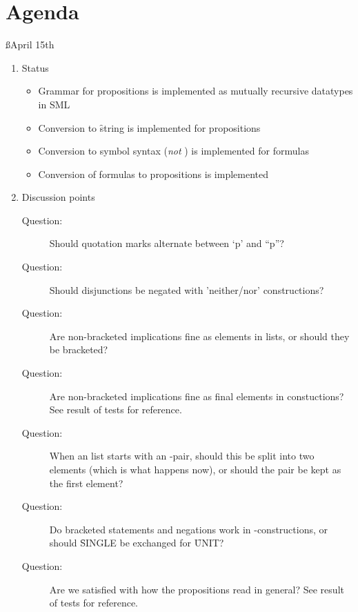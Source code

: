 \documentclass[a4paper]{article}
\begin{document}
\section{Agenda}

\ss{April 15th}

\begin{enumerate}
  \item Status
    \begin{itemize}
      \item Grammar for propositions is implemented as mutually recursive 
      datatypes in SML

      \item Conversion to \f{string} is implemented for propositions
      
      \item Conversion to symbol syntax (\emph{not} ) is
      implemented for formulas

      \item Conversion of formulas to propositions is implemented
    \end{itemize}

  \item Discussion points
    \begin{description}
      \item[Question:] Should quotation marks alternate between `p' and 
      ``p''?

      \item[Question:] Should disjunctions be negated with 'neither/nor'
      constructions?

      \item[Question:] Are non-bracketed implications fine as elements in
      lists, or should they be bracketed?

      \item[Question:] Are non-bracketed implications fine as final elements
      in  constuctions? See result of tests for reference.

      \item[Question:] When an  list starts with an -pair, 
      should this be split into two elements (which is what happens now), 
      or should the pair be kept as the first element?

      \item[Question:] Do bracketed statements and negations work in
      -constructions, or should \f{SINGLE} be exchanged for 
      \f{UNIT}?

      \item[Question:] Are we satisfied with how the propositions read in
      general? See result of tests for reference.
    \end{description}


\end{enumerate}
\end{document}
